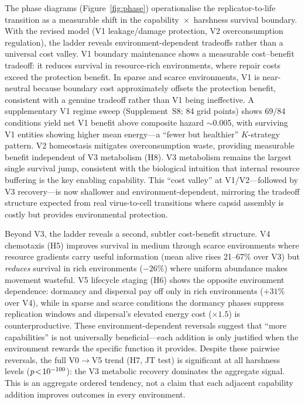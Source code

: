\documentclass[letterpaper]{article}
\begin{document}
The phase diagrams (Figure~\ref{fig:phase}) operationalise the replicator-to-life
transition as a measurable shift in the capability~$\times$~harshness survival
boundary.
With the revised model (V1 leakage/damage protection, V2 overconsumption
regulation), the ladder reveals environment-dependent tradeoffs rather than
a universal cost valley.
V1 boundary maintenance shows a measurable cost--benefit tradeoff: it reduces
survival in resource-rich environments, where repair costs exceed the
protection benefit.
In sparse and scarce environments, V1 is near-neutral because boundary cost
approximately offsets the protection benefit, consistent with a genuine
tradeoff rather than V1 being ineffective.
A supplementary V1 regime sweep (Supplement~S8; 84 grid points) shows 69/84
conditions yield net V1 benefit above composite hazard $\sim$0.005, with
surviving V1 entities showing higher mean energy---a ``fewer but healthier''
$K$-strategy pattern.
V2 homeostasis mitigates overconsumption waste, providing measurable benefit
independent of V3 metabolism (H8).
V3 metabolism remains the largest single survival jump, consistent with
the biological intuition that internal resource buffering is the key
enabling capability.
This ``cost valley'' at V1/V2---followed by V3 recovery---is now shallower
and environment-dependent, mirroring the tradeoff structure expected from
real virus-to-cell transitions where capsid assembly is costly but provides
environmental protection.

Beyond V3, the ladder reveals a second, subtler cost-benefit structure.
V4 chemotaxis (H5) improves survival in medium through scarce environments
where resource gradients carry useful information (mean alive rises 21--67\%
over V3) but \emph{reduces} survival in rich environments ($-26\%$) where
uniform abundance makes movement wasteful.
V5 lifecycle staging (H6) shows the opposite environment dependence: dormancy
and dispersal pay off only in rich environments ($+31\%$ over V4), while in
sparse and scarce conditions the dormancy phases suppress replication windows
and dispersal's elevated energy cost ($\times 1.5$) is counterproductive.
These environment-dependent reversals suggest that ``more capabilities''
is not universally beneficial---each addition is only justified when
the environment rewards the specific function it provides.
Despite these pairwise reversals, the full V0$\to$V5 trend (H7, JT test)
is significant at all harshness levels ($p\!<\!10^{-100}{}$): the V3 metabolic
recovery dominates the aggregate signal.
This is an aggregate ordered tendency, not a claim that each adjacent
capability addition improves outcomes in every environment.
\end{document}
